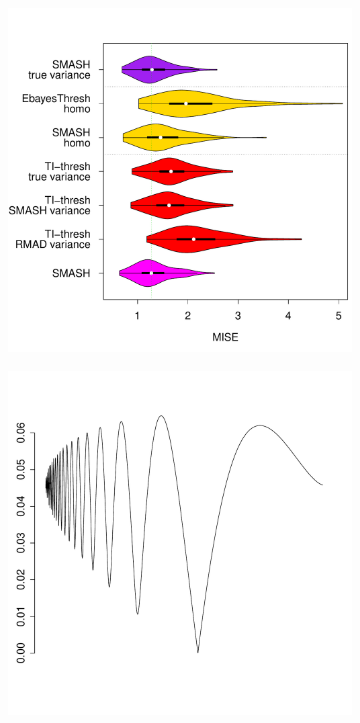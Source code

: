 \documentclass[12pt]{article}
\begin{document}
\begin{figure}
\begin{subfigure}[b]{0.45\textwidth}
        \caption{}
        \label{fig:gaus_hetero_sd_1}
    \end{subfigure}
		\hfill
    \begin{subfigure}[b]{0.5\textwidth}
        \centering
        \includegraphics[width=\textwidth]{violin_gaus_hetero_2.pdf}
        \caption{}
        \label{fig:gaus_hetero_2}
    \end{subfigure}
		\hfill
    \begin{subfigure}[b]{0.45\textwidth}
        \centering
        \includegraphics[width=\textwidth]{violin_gaus_hetero_sd_2.pdf}

\end{subfigure}
\end{figure}
\end{document}

